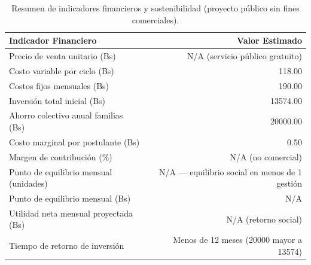 \begin{table}[htbp]
    \centering
    \caption{Resumen de indicadores financieros y sostenibilidad (proyecto público sin fines comerciales).}
    \label{tab:indicadores_financieros}
    \begin{tabular}{lr}
        \toprule
        \textbf{Indicador Financiero} & \textbf{Valor Estimado} \\
        \midrule
        Precio de venta unitario (Bs)            & N/A (servicio público gratuito) \\
        Costo variable por ciclo (Bs)            & 118.00 \\
        Costos fijos mensuales (Bs)              & 190.00 \\
        Inversión total inicial (Bs)             & 13574.00 \\
        Ahorro colectivo anual familias (Bs)     & 20000.00 \\
        Costo marginal por postulante (Bs)       & 0.50 \\
        Margen de contribución (\%)              & N/A (no comercial) \\
        Punto de equilibrio mensual (unidades)   & N/A — equilibrio social en menos de 1 gestión \\
        Punto de equilibrio mensual (Bs)         & N/A \\
        Utilidad neta mensual proyectada (Bs)    & N/A (retorno social) \\
        Tiempo de retorno de inversión           & Menos de 12 meses (20000 mayor a 13574) \\
        \bottomrule
    \end{tabular}
\end{table}
